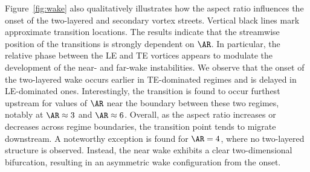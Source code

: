 Figure~\ref{fig:wake} also qualitatively illustrates how the aspect ratio influences the onset of the two-layered and secondary vortex streets. Vertical black lines mark approximate transition locations. The results indicate that the streamwise position of the transitions is strongly dependent on $\AR$. In particular, the relative phase between the LE and TE vortices appears to modulate the development of the near- and far-wake instabilities.
%
We observe that the onset of the two-layered wake occurs earlier in TE-dominated regimes and is delayed in LE-dominated ones. Interestingly, the transition is found to occur furthest upstream for values of $\AR$ near the boundary between these two regimes, notably at $\AR \approx 3$ and $\AR \approx 6$. Overall, as the aspect ratio increases or decreases across regime boundaries, the transition point tends to migrate downstream.
%
A noteworthy exception is found for $\AR = 4$, where no two-layered structure is observed. Instead, the near wake exhibits a clear two-dimensional bifurcation, resulting in an asymmetric wake configuration from the onset.


